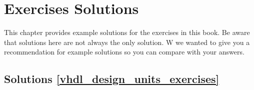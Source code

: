 %
%
\chapter{Exercises Solutions}
This chapter provides example solutions for the exercises in this book. Be aware that solutions here are not always the only solution. W we wanted to give you a recommendation for example solutions so you can compare with your answers.

\section{Solutions \ref{vhdl_design_units_exercises}~}
